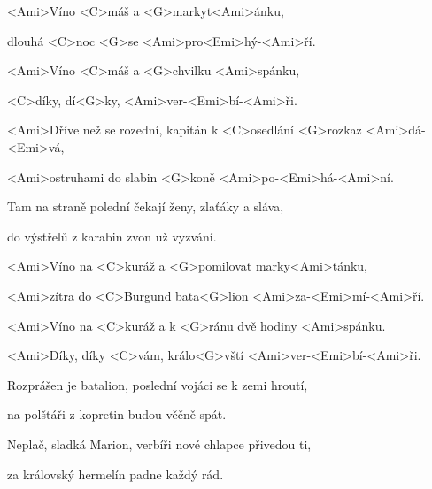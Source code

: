 

<Ami>Víno <C>máš a <G>markyt<Ami>ánku,

dlouhá <C>noc <G>se <Ami>pro<Emi>hý-<Ami>ří.

<Ami>Víno <C>máš a <G>chvilku <Ami>spánku,

<C>díky, dí<G>ky, <Ami>ver-<Emi>bí-<Ami>ři.

\zs
<Ami>Dříve než se rozední,
kapitán k <C>osedlání <G>rozkaz <Ami>dá-<Emi>vá,

<Ami>ostruhami do slabin <G>koně <Ami>po-<Emi>há-<Ami>ní.

Tam na straně polední
čekají ženy, zlaťáky a sláva,

do výstřelů z karabin zvon už vyzvání.
\ks

\zr
<Ami>Víno na <C>kuráž a <G>pomilovat marky<Ami>tánku,

<Ami>zítra do <C>Burgund bata<G>lion 
<Ami>za-<Emi>mí-<Ami>ří.

<Ami>Víno na <C>kuráž a k <G>ránu dvě hodiny <Ami>spánku.

<Ami>Díky, díky <C>vám, králo<G>vští 
<Ami>ver-<Emi>bí-<Ami>ři.
\kr

\zs
Rozprášen je batalion,
poslední vojáci se k zemi hroutí,

na polštáři z kopretin budou věčně spát.

Neplač, sladká Marion,
verbíři nové chlapce přivedou ti,

za královský hermelín padne každý rád.
\ks

\zr \kr

\kp





